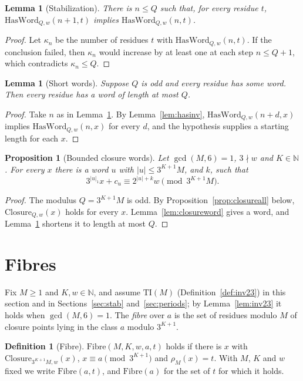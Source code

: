 \documentclass[11pt,reqno,oneside]{amsart}
\theoremstyle{plain}
\newtheorem{proposition}[theorem]{Proposition}
\newtheorem{lemma}[theorem]{Lemma}
\theoremstyle{definition}
\newtheorem{definition}[theorem]{Definition}
\numberwithin{equation}{section}
\begin{document}
\begin{lemma}[Stabilization]\label{lem:stable}
There is $n\le Q$ such that, for every residue $t$, $\mathrm{HasWord}_{Q,w}(n+1,t)$ implies $\mathrm{HasWord}_{Q,w}(n,t)$.
\end{lemma}
\begin{proof}
Let $\kappa_n$ be the number of residues $t$ with $\mathrm{HasWord}_{Q,w}(n,t)$. If the conclusion failed, then $\kappa_n$ would increase by at least one at each step $n\le Q+1$, which contradicts $\kappa_n\le Q$.
\end{proof}

\begin{lemma}[Short words]\label{lem:shortall}
Suppose $Q$ is odd and every residue has some word. Then every residue has a word of length at most $Q$.
\end{lemma}
\begin{proof}
Take $n$ as in Lemma~\ref{lem:stable}. By Lemma~\ref{lem:hasinv}, $\mathrm{HasWord}_{Q,w}(n+d,x)$ implies $\mathrm{HasWord}_{Q,w}(n,x)$ for every $d$, and the hypothesis supplies a starting length for each $x$.
\end{proof}

\begin{proposition}[Bounded closure words]\label{prop:closureshort}
Let $\gcd(M,6)=1$, $3\nmid w$ and $K\in\mathbb N$. For every $x$ there is a word $u$ with $|u|\le3^{K+1}M$, and $k$, such that
\[
3^{|u|_1}x+c_u\equiv2^{|u|+k}w\pmod{3^{K+1}M}.
\]
\end{proposition}
\begin{proof}
The modulus $Q=3^{K+1}M$ is odd. By Proposition~\ref{prop:closureall} below, $\mathrm{Closure}_{Q,w}(x)$ holds for every $x$. Lemma~\ref{lem:closureword} gives a word, and Lemma~\ref{lem:shortall} shortens it to length at most $Q$.
\end{proof}

\section{Fibres}\label{sec:fibres}

Fix $M\ge1$ and $K,w\in\mathbb N$, and assume $\mathrm{TI}(M)$ (Definition~\ref{def:inv23}) in this section and in Sections~\ref{sec:stab} and~\ref{sec:periods}; by Lemma~\ref{lem:inv23} it holds when $\gcd(M,6)=1$. The \emph{fibre} over $a$ is the set of residues modulo $M$ of closure points lying in the class $a$ modulo $3^{K+1}$.

\begin{definition}[Fibre]\label{def:fibre}
$\mathrm{Fibre}(M,K,w,a,t)$ holds if there is $x$ with $\mathrm{Closure}_{3^{K+1}M,w}(x)$, $x\equiv a\pmod{3^{K+1}}$ and $\rho_M(x)=t$. With $M$, $K$ and $w$ fixed we write $\mathrm{Fibre}(a,t)$, and $\mathrm{Fibre}(a)$ for the set of $t$ for which it holds.
\end{definition}
\end{document}
